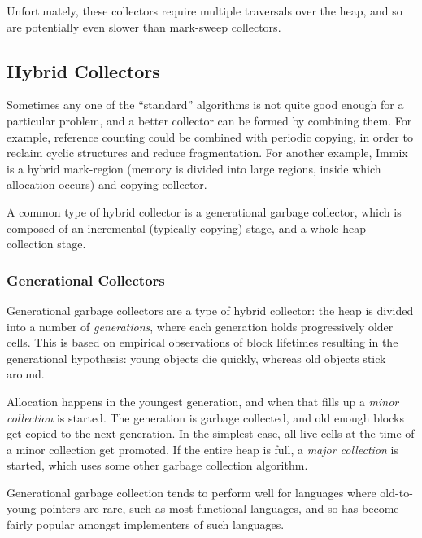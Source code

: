 Unfortunately, these collectors require multiple traversals over the
heap, and so are potentially even slower than mark-sweep
collectors\cite{GarbageCollection}.

\subsection{Hybrid Collectors}
\label{sec:lit-gc-hybrid}

Sometimes any one of the ``standard'' algorithms is not quite good
enough for a particular problem, and a better collector can be formed
by combining them. For example, reference counting could be combined
with periodic copying, in order to reclaim cyclic structures and
reduce fragmentation. For another example, Immix\cite{Blackburn08} is
a hybrid mark-region (memory is divided into large regions, inside
which allocation occurs) and copying collector.

A common type of hybrid collector is a generational garbage collector,
which is composed of an incremental (typically copying) stage, and a
whole-heap collection stage.

\subsubsection{Generational Collectors}
\label{sec:lit-gc-hybrid-generational}

Generational garbage collectors are a type of hybrid collector: the
heap is divided into a number of \textit{generations}, where each
generation holds progressively older cells. This is based on empirical
observations of block lifetimes resulting in the generational
hypothesis: young objects die quickly, whereas old objects stick
around\cite{Ungar84}.

Allocation happens in the youngest generation, and when that fills up
a \textit{minor collection} is started. The generation is garbage
collected, and old enough blocks get copied to the next
generation. In the simplest case, all live cells at the
time of a minor collection get promoted. If the entire heap is full, a
\textit{major collection} is started, which uses some other garbage
collection algorithm\cite{GarbageCollection}.

Generational garbage collection tends to perform well for languages
where old-to-young pointers are rare, such as most
functional languages, and so has become fairly popular amongst
implementers of such languages.

